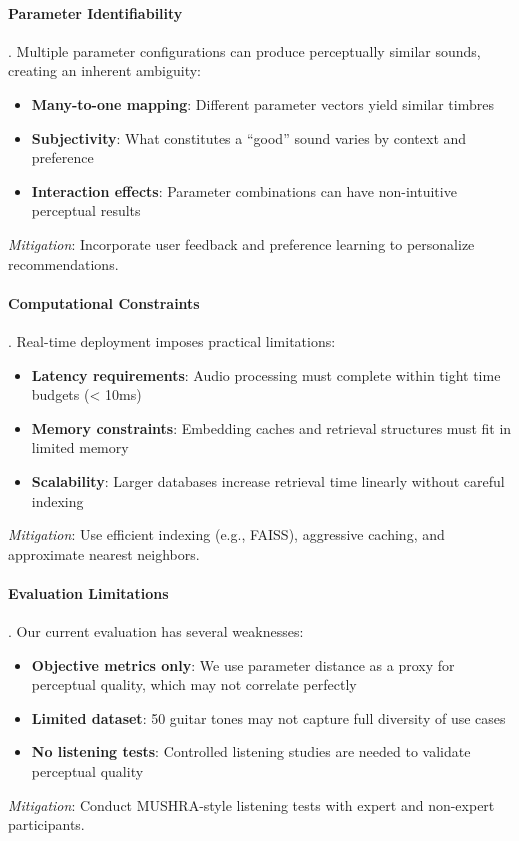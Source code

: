 \paragraph{Parameter Identifiability}. Multiple parameter configurations can produce perceptually similar sounds, creating an inherent ambiguity:
\begin{itemize}
	\item \textbf{Many-to-one mapping}: Different parameter vectors yield similar timbres
	\item \textbf{Subjectivity}: What constitutes a ``good'' sound varies by context and preference
	\item \textbf{Interaction effects}: Parameter combinations can have non-intuitive perceptual results
\end{itemize}
\textit{Mitigation}: Incorporate user feedback and preference learning to personalize recommendations.

\paragraph{Computational Constraints}. Real-time deployment imposes practical limitations:
\begin{itemize}
	\item \textbf{Latency requirements}: Audio processing must complete within tight time budgets (< 10ms)
	\item \textbf{Memory constraints}: Embedding caches and retrieval structures must fit in limited memory
	\item \textbf{Scalability}: Larger databases increase retrieval time linearly without careful indexing
\end{itemize}
\textit{Mitigation}: Use efficient indexing (e.g., FAISS), aggressive caching, and approximate nearest neighbors.

\paragraph{Evaluation Limitations}. Our current evaluation has several weaknesses:
\begin{itemize}
	\item \textbf{Objective metrics only}: We use parameter distance as a proxy for perceptual quality, which may not correlate perfectly
	\item \textbf{Limited dataset}: 50 guitar tones may not capture full diversity of use cases
	\item \textbf{No listening tests}: Controlled listening studies are needed to validate perceptual quality
\end{itemize}
\textit{Mitigation}: Conduct MUSHRA-style listening tests with expert and non-expert participants.
